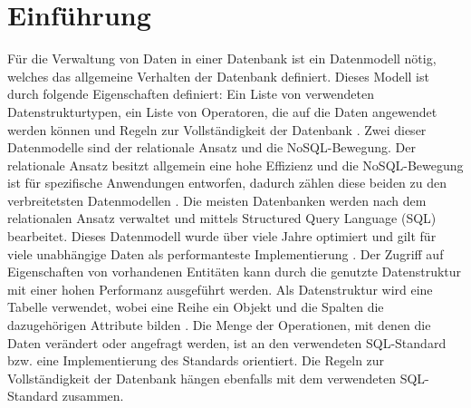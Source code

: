 
\chapter{Einführung} %

\label{Kaptiel1} %


\newcommand{\keyword}[1]{\textit{#1}}
\newcommand{\tabhead}[1]{\textbf{#1}}
\newcommand{\code}[1]{\texttt{#1}}
\newcommand{\file}[1]{\texttt{\bfseries#1}}
\newcommand{\option}[1]{\texttt{\itshape#1}}

Für die Verwaltung von Daten in einer Datenbank ist ein Datenmodell nötig, welches das allgemeine Verhalten der Datenbank definiert. Dieses Modell ist durch folgende Eigenschaften definiert: Ein Liste von verwendeten Datenstrukturtypen, ein Liste von Operatoren, die auf die Daten angewendet werden können und Regeln zur Vollständigkeit der Datenbank \parencite{codd1981data}. Zwei dieser Datenmodelle sind der relationale Ansatz und die NoSQL-Bewegung. Der relationale Ansatz besitzt  allgemein eine hohe Effizienz und die NoSQL-Bewegung ist für spezifische Anwendungen entworfen, dadurch zählen diese  beiden zu den verbreitetsten Datenmodellen  \parencite{vicknair2010comparison}. \newline
Die meisten Datenbanken werden nach dem relationalen Ansatz verwaltet und mittels Structured Query Language (SQL) bearbeitet. Dieses Datenmodell wurde über viele Jahre optimiert und gilt für viele unabhängige Daten als performanteste Implementierung \parencite{miller2013graph}. Der Zugriff auf Eigenschaften von vorhandenen Entitäten kann durch die genutzte Datenstruktur mit einer hohen Performanz ausgeführt werden. Als Datenstruktur wird eine Tabelle verwendet, wobei eine Reihe ein Objekt  und die Spalten die dazugehörigen Attribute bilden \parencite{tatarinov2002storing}. Die Menge der Operationen, mit denen die Daten verändert oder angefragt werden, ist an den verwendeten SQL-Standard bzw. eine Implementierung des Standards orientiert. Die Regeln zur Vollständigkeit der Datenbank hängen ebenfalls mit dem verwendeten SQL-Standard zusammen.  \newline 
